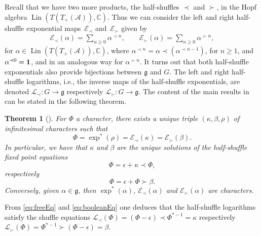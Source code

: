 \documentclass[pdftex]{sigma}%
\numberwithin{equation}{section}
\newtheorem{Theorem}{Theorem}[section]
\newcommand{\g}{\mathfrak{g}}
\newcommand{\A}{\mathcal{A}}
\newcommand{\uno}{{\bf{1}}}
\newcommand{\Expl}{\mathcal{E}_\prec}
\newcommand{\Expr}{\mathcal{E}_\succ}
\begin{document}
Recall that we have two more products, the half-shuffles $\prec$ and $\succ$, in the Hopf algebra $\operatorname{Lin}(T(T_+(\A)),\mathbb{C})$. Thus we can consider the left and right half-shuffle exponential maps~$\Expl$ and~$\Expr$ given by
\begin{gather*}
	\Expl(\alpha)
	= \sum_{n\geq0} \alpha^{\prec n},\qquad
	\Expr(\alpha)
	= \sum_{n\geq0} \alpha^{\succ n},
\end{gather*}
for $\alpha\in \operatorname{Lin}(T(T_+(\A)),\mathbb{C})$, where $\alpha^{\prec n} = \alpha \prec (\alpha^{\prec n-1})$, for $n\geq1$, and $\alpha^{\prec 0} = \uno$, and in an analogous way for $\alpha^{\succ n}$. It turns out that both half-shuffle exponentials also provide bijections between $\g$ and $G$. The left and right half-shuffle logarithms, i.e., the inverse maps of the half-shuffle exponentials, are denoted $\mathcal{L}_\prec\colon G \to \g$ respectively $\mathcal{L}_\succ\colon G \to \g$. The content of the main results in \cite{EFP1,EFP3} can be stated in the following theorem.

\begin{Theorem}[\cite{EFP1,EFP3}]\label{thm:basicEFP}
For $\Phi$ a character, there exists a unique triple $(\kappa,\beta,\rho)$ of infinitesimal characters such that
\begin{equation}\label{eq:shuffleMCRel}
	\Phi = \exp^*(\rho) = \Expl(\kappa) = \Expr(\beta).
\end{equation}
In particular, we have that $\kappa$ and $\beta$ are the unique solutions of the half-shuffle fixed point equations
\begin{equation}\label{eq:freeEq}
	\Phi = \epsilon + \kappa\prec \Phi,
\end{equation}
respectively
\begin{equation}\label{eq:booleanEq}
	\Phi = \epsilon +\Phi\succ \beta.
\end{equation}
Conversely, given $\alpha\in \g$, then $\exp^*(\alpha)$, $\Expl(\alpha)$ and $\Expr(\alpha)$ are characters.
\end{Theorem}

From \eqref{eq:freeEq} and \eqref{eq:booleanEq} one deduces that the half-shuffle logarithms satisfy the shuffle equations $\mathcal{L}_\prec(\Phi)=(\Phi-\epsilon) \prec\Phi^{*-1}=\kappa$ respectively $\mathcal{L}_\succ(\Phi)=\Phi^{*-1} \succ (\Phi-\epsilon)=\beta$.
\end{document}
